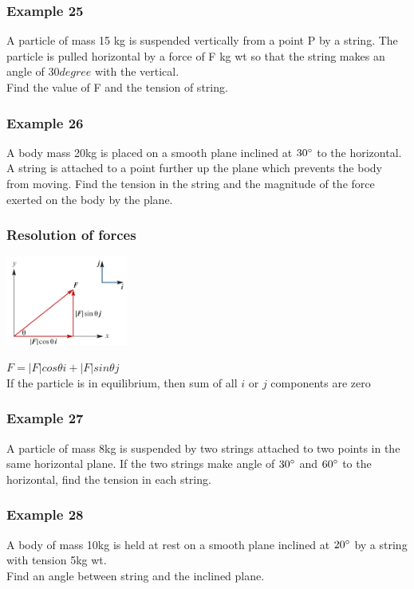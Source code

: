 \documentclass[
	11pt, %
]{beamer}
\newcommand{\blank}{\begin{frame}\end{frame}}
\begin{document}
\begin{frame}[t]
    \frametitle{Example 25}
    A particle of mass 15 kg is suspended vertically from a point P by a string. The particle is pulled horizontal by 
    a force of F kg wt so that the string makes an angle of $30degree$ with the vertical.\\
    Find the value of F and the tension of string.
\end{frame}
\blank

\begin{frame}[t]
    \frametitle{Example 26}
    A body mass 20kg is placed on a smooth plane inclined at $30\degree$ to the horizontal. A string is attached to a point 
    further up the plane which prevents the body from moving. Find the tension in the string and the magnitude of the force exerted on the body by the plane.
\end{frame}
\blank

\begin{frame}
    \frametitle{Resolution of forces}
    \begin{center}
        \includegraphics[width = 4cm]{Resolution.png}
    \end{center}
    $F = |F|cos\theta i + |F|sin\theta j$\\
    \alert{If the particle is in equilibrium, then sum of all $i$ or $j$ components are zero}
\end{frame}

\begin{frame}[t]
    \frametitle{Example 27}
    A particle of mass 8kg is suspended by two strings attached to two points in the same horizontal plane. If the two strings make angle of $30\degree$ and 
    $60\degree$ to the horizontal, find the tension in each string.
\end{frame}
\blank

\begin{frame}[t]
    \frametitle{Example 28}
    A body of mass 10kg is held at rest on a smooth plane inclined at $20\degree$ by a string with tension 5kg wt.\\
    Find an angle between string and the inclined plane.
\end{frame}
\blank
\end{document}
